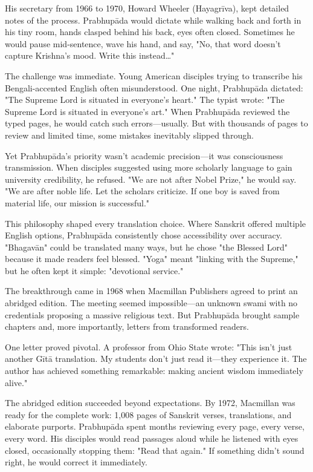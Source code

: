 \documentclass[11pt,twoside]{book}
\begin{document}
His secretary from 1966 to 1970, Howard Wheeler (Hayagrīva), kept detailed notes of the process. Prabhupāda would dictate while walking back and forth in his tiny room, hands clasped behind his back, eyes often closed. Sometimes he would pause mid-sentence, wave his hand, and say, "No, that word doesn't capture Krishna's mood. Write this instead\ldots{}"

The challenge was immediate. Young American disciples trying to transcribe his Bengali-accented English often misunderstood. One night, Prabhupāda dictated: "The Supreme Lord is situated in everyone's heart." The typist wrote: "The Supreme Lord is situated in everyone's art." When Prabhupāda reviewed the typed pages, he would catch such errors—usually. But with thousands of pages to review and limited time, some mistakes inevitably slipped through.

Yet Prabhupāda's priority wasn't academic precision—it was consciousness transmission. When disciples suggested using more scholarly language to gain university credibility, he refused. "We are not after Nobel Prize," he would say. "We are after noble life. Let the scholars criticize. If one boy is saved from material life, our mission is successful."

This philosophy shaped every translation choice. Where Sanskrit offered multiple English options, Prabhupāda consistently chose accessibility over accuracy. "Bhagavān" could be translated many ways, but he chose "the Blessed Lord" because it made readers feel blessed. "Yoga" meant "linking with the Supreme," but he often kept it simple: "devotional service."

The breakthrough came in 1968 when Macmillan Publishers agreed to print an abridged edition. The meeting seemed impossible—an unknown swami with no credentials proposing a massive religious text. But Prabhupāda brought sample chapters and, more importantly, letters from transformed readers.

One letter proved pivotal. A professor from Ohio State wrote: "This isn't just another Gītā translation. My students don't just read it—they experience it. The author has achieved something remarkable: making ancient wisdom immediately alive."

The abridged edition succeeded beyond expectations. By 1972, Macmillan was ready for the complete work: 1,008 pages of Sanskrit verses, translations, and elaborate purports. Prabhupāda spent months reviewing every page, every verse, every word. His disciples would read passages aloud while he listened with eyes closed, occasionally stopping them: "Read that again." If something didn't sound right, he would correct it immediately.
\end{document}
